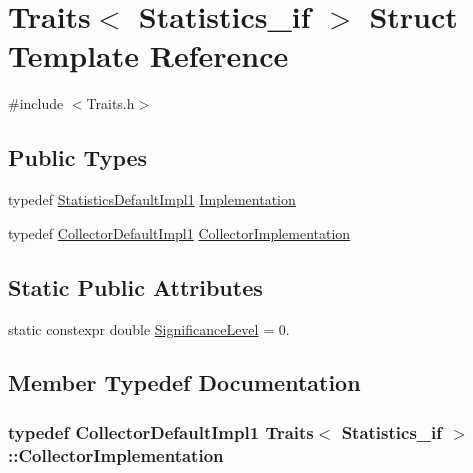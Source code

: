 \hypertarget{struct_traits_3_01_statistics__if_01_4}{}\section{Traits$<$ Statistics\+\_\+if $>$ Struct Template Reference}
\label{struct_traits_3_01_statistics__if_01_4}


{\ttfamily \#include $<$Traits.\+h$>$}

\subsection*{Public Types}
\begin{DoxyCompactItemize}
\item 
typedef \hyperlink{class_statistics_default_impl1}{Statistics\+Default\+Impl1} \hyperlink{struct_traits_3_01_statistics__if_01_4_a885cb965f65b240ad3ff46bb1278bb2d}{Implementation}
\item 
typedef \hyperlink{class_collector_default_impl1}{Collector\+Default\+Impl1} \hyperlink{struct_traits_3_01_statistics__if_01_4_a8fbc8780648bb2ee89c76cc9c2a3a62b}{Collector\+Implementation}
\end{DoxyCompactItemize}
\subsection*{Static Public Attributes}
\begin{DoxyCompactItemize}
\item 
static constexpr double \hyperlink{struct_traits_3_01_statistics__if_01_4_a69e22343c5444e5e557bbaf85b3b3d8b}{Significance\+Level} = 0.
\end{DoxyCompactItemize}


\subsection{Member Typedef Documentation}
\subsubsection[{\texorpdfstring{Collector\+Implementation}{CollectorImplementation}}]{\setlength{\rightskip}{0pt plus 5cm}typedef {\bf Collector\+Default\+Impl1} {\bf Traits}$<$ {\bf Statistics\+\_\+if} $>$\+::{\bf Collector\+Implementation}}\hypertarget{struct_traits_3_01_statistics__if_01_4_a8fbc8780648bb2ee89c76cc9c2a3a62b}{}\label{struct_traits_3_01_statistics__if_01_4_a8fbc8780648bb2ee89c76cc9c2a3a62b}

